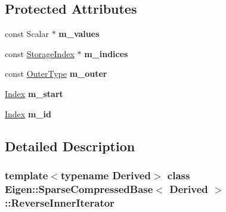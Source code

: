 \subsection*{Protected Attributes}
\begin{DoxyCompactItemize}
\item 
\mbox{\label{class_eigen_1_1_sparse_compressed_base_1_1_reverse_inner_iterator_ab53cb4e8f49e9e60f4ec8ae67ee03bd0}} 
const Scalar $\ast$ {\bfseries m\+\_\+values}
\item 
\mbox{\label{class_eigen_1_1_sparse_compressed_base_1_1_reverse_inner_iterator_a2703181320a715db015a675ba40f3fe2}} 
const \hyperlink{group___sparse_core___module_a0b540ba724726ebe953f8c0df06081ed}{Storage\+Index} $\ast$ {\bfseries m\+\_\+indices}
\item 
\mbox{\label{class_eigen_1_1_sparse_compressed_base_1_1_reverse_inner_iterator_ac648cf1165e7ad23f665990191910e40}} 
const \hyperlink{class_eigen_1_1internal_1_1variable__if__dynamic}{Outer\+Type} {\bfseries m\+\_\+outer}
\item 
\mbox{\label{class_eigen_1_1_sparse_compressed_base_1_1_reverse_inner_iterator_a9614e400ccaa3b7a6c864da414f0531e}} 
\hyperlink{group___core___module_a554f30542cc2316add4b1ea0a492ff02}{Index} {\bfseries m\+\_\+start}
\item 
\mbox{\label{class_eigen_1_1_sparse_compressed_base_1_1_reverse_inner_iterator_a09af4445f7bdec54279184a310a7377a}} 
\hyperlink{group___core___module_a554f30542cc2316add4b1ea0a492ff02}{Index} {\bfseries m\+\_\+id}
\end{DoxyCompactItemize}


\subsection{Detailed Description}
\subsubsection*{template$<$typename Derived$>$\newline
class Eigen\+::\+Sparse\+Compressed\+Base$<$ Derived $>$\+::\+Reverse\+Inner\+Iterator}



